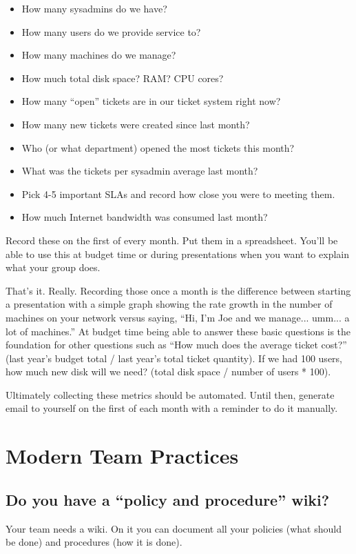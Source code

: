 \documentclass{article}
\begin{document}
\begin{itemize}
    \item How many sysadmins do we have?
    \item How many users do we provide service to?
    \item How many machines do we manage?
    \item How much total disk space? RAM? CPU cores?
    \item How many ``open'' tickets are in our ticket system right now?
    \item How many new tickets were created since last month?
    \item Who (or what department) opened the most tickets this month?
    \item What was the tickets per sysadmin average last month?
    \item Pick 4-5 important SLAs and record how close you were to meeting them.
    \item How much Internet bandwidth was consumed last month?
\end{itemize}

Record these on the first of every month. Put them in a spreadsheet. You'll be able to use this at budget time or during presentations when you want to explain what your group does.

That's it. Really. Recording those once a month is the difference between starting a presentation with a simple graph showing the rate growth in the number of machines on your network versus saying, ``Hi, I'm Joe and we manage... umm... a lot of machines.'' At budget time being able to answer these basic questions is the foundation for other questions such as ``How much does the average ticket cost?'' (last year's budget total / last year's total ticket quantity). If we had 100 users, how much new disk will we need? (total disk space / number of users * 100).

Ultimately collecting these metrics should be automated. Until then, generate email to yourself on the first of each month with a reminder to do it manually.

\section{Modern Team Practices}
\subsection{Do you have a ``policy and procedure'' wiki?}
Your team needs a wiki. On it you can document all your policies (what should be done) and procedures (how it is done).
\end{document}
